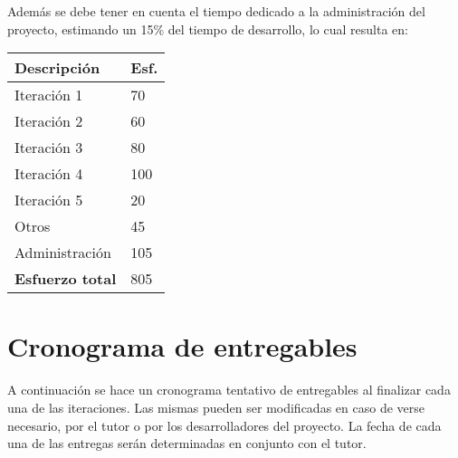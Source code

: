 \documentclass[
11pt, %
spanish, %
singlespacing, %
headsepline, %
]{MastersDoctoralThesis} %
\begin{document}
Además se debe tener en cuenta el tiempo dedicado a la administración del proyecto, estimando un 15\% del tiempo de desarrollo, lo cual resulta en:

{
\setlength{\extrarowheight}{.2em}
\begin{center}
	\begin{tabular}{|l|l|}
    \hline
    \textbf{Descripción} & \textbf{Esf.}  \\ \hline
    Iteración 1 & 70 \\ \hline
    Iteración 2 & 60 \\ \hline
    Iteración 3 & 80 \\ \hline
    Iteración 4 & 100 \\ \hline
    Iteración 5 & 20 \\ \hline
    Otros & 45 \\ \hline     
    Administración & 105 \\ \hline
    \textbf{Esfuerzo total} & 805 \\ \hline
    \end{tabular}
\end{center}
}

\section{Cronograma de entregables}
A continuación se hace un cronograma tentativo de entregables al finalizar cada una de las iteraciones. Las mismas pueden ser modificadas en caso de verse necesario, por el tutor o por los desarrolladores del proyecto. La fecha de cada una de las entregas serán determinadas en conjunto con el tutor.
\end{document}
